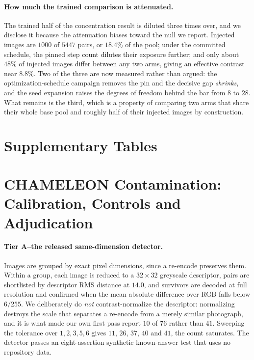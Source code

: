\documentclass{article}
\begin{document}
\paragraph{How much the trained comparison is attenuated.} The trained half of the concentration
result is diluted three times over, and we disclose it because the attenuation biases toward the
null we report. Injected images are $1000$ of $5447$ pairs, or $18.4\%$ of the pool; under the
committed schedule, the pinned step count dilutes their exposure further; and only about $48\%$ of
injected images differ between any two arms, giving an effective contrast near $8.8\%$. Two of the
three are now measured rather than argued: the optimization-schedule campaign removes the pin and
the decisive gap \emph{shrinks}, and the seed expansion raises the degrees of freedom behind the
bar from $8$ to $28$. What remains is the third, which is a property of comparing two arms that
share their whole base pool and roughly half of their injected images by construction.

\section{Supplementary Tables}
\label{app:tables}





\clearpage


\section{CHAMELEON Contamination: Calibration, Controls and Adjudication}
\label{app:chamext}

\paragraph{Tier A--the released same-dimension detector.} Images are grouped by exact pixel
dimensions, since a re-encode preserves them. Within a group, each image is reduced to a
$32\times32$ greyscale descriptor, pairs are shortlisted by descriptor RMS distance at $14.0$, and
survivors are decoded at full resolution and confirmed when the mean absolute difference over RGB
falls below $6/255$. We deliberately do \emph{not} contrast-normalize the descriptor: normalizing
destroys the scale that separates a re-encode from a merely similar photograph, and it is what made
our own first pass report $10$ of $76$ rather than $41$. Sweeping the tolerance over
$1, 2, 3, 5, 6$ gives $11$, $26$, $37$, $40$ and $41$, the count saturates. The detector passes an
eight-assertion synthetic known-answer test that uses no repository data.
\end{document}

